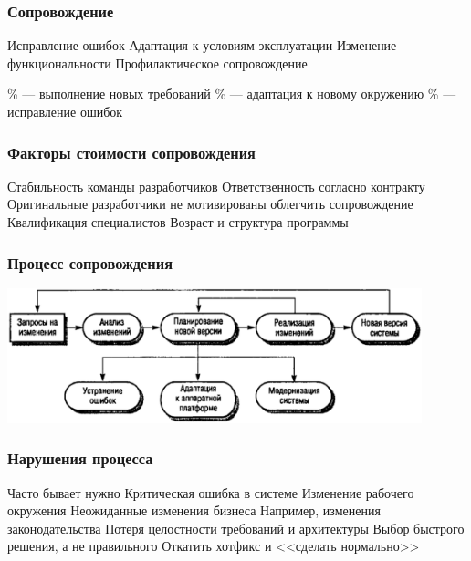 \documentclass{../../slides-style}
\begin{document}
    \begin{frame}
        \frametitle{Сопровождение}
        \begin{outline}
            \1 Исправление ошибок
            \1 Адаптация к условиям эксплуатации
            \1 Изменение функциональности
            \1 Профилактическое сопровождение
        \end{outline}
        \pause
        \vspace{5mm}
        \begin{outline}
            \% --- выполнение новых требований
            \% --- адаптация к новому окружению
            \% --- исправление ошибок
        \end{outline}
    \end{frame}

    \begin{frame}
        \frametitle{Факторы стоимости сопровождения}
        \begin{outline}
            \1 Стабильность команды разработчиков
            \1 Ответственность согласно контракту
                \2 Оригинальные разработчики не мотивированы облегчить сопровождение
            \1 Квалификация специалистов
            \1 Возраст и структура программы
        \end{outline}
    \end{frame}

    \begin{frame}
        \frametitle{Процесс сопровождения}
        \begin{center}
            \includegraphics[width=0.9\textwidth]{maintenanceProcess.png}
        \end{center}
    \end{frame}

    \begin{frame}
        \frametitle{Нарушения процесса}
        \begin{outline}
            \1 Часто бывает нужно
                \2 Критическая ошибка в системе
                \2 Изменение рабочего окружения
                \2 Неожиданные изменения бизнеса
                    \3 Например, изменения законодательства
            \1 Потеря целостности требований и архитектуры
            \1 Выбор быстрого решения, а не правильного
                \2 Откатить хотфикс и <<сделать нормально>>
        \end{outline}
    \end{frame}
\end{document}
